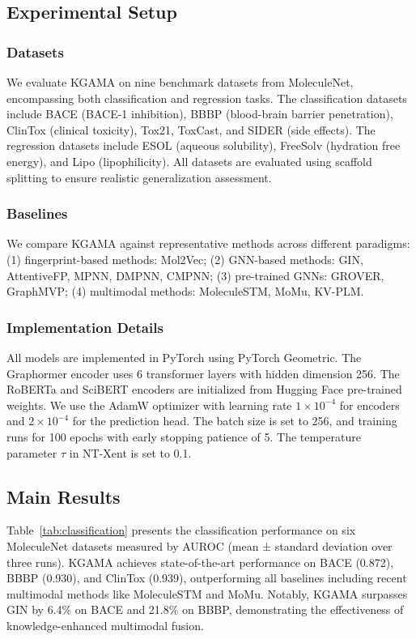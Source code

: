 \documentclass[journal]{IEEEtran}
\begin{document}
\subsection{Experimental Setup}
\subsubsection{Datasets}
We evaluate KGAMA on nine benchmark datasets from MoleculeNet, encompassing both classification and regression tasks. The classification datasets include BACE (BACE-1 inhibition), BBBP (blood-brain barrier penetration), ClinTox (clinical toxicity), Tox21, ToxCast, and SIDER (side effects). The regression datasets include ESOL (aqueous solubility), FreeSolv (hydration free energy), and Lipo (lipophilicity). All datasets are evaluated using scaffold splitting to ensure realistic generalization assessment.

\subsubsection{Baselines}
We compare KGAMA against representative methods across different paradigms: (1) fingerprint-based methods: Mol2Vec; (2) GNN-based methods: GIN, AttentiveFP, MPNN, DMPNN, CMPNN; (3) pre-trained GNNs: GROVER, GraphMVP; (4) multimodal methods: MoleculeSTM, MoMu, KV-PLM.

\subsubsection{Implementation Details}
All models are implemented in PyTorch using PyTorch Geometric. The Graphormer encoder uses 6 transformer layers with hidden dimension 256. The RoBERTa and SciBERT encoders are initialized from Hugging Face pre-trained weights. We use the AdamW optimizer with learning rate $1 \times 10^{-4}$ for encoders and $2 \times 10^{-4}$ for the prediction head. The batch size is set to 256, and training runs for 100 epochs with early stopping patience of 5. The temperature parameter $\tau$ in NT-Xent is set to 0.1.

\subsection{Main Results}
Table~\ref{tab:classification} presents the classification performance on six MoleculeNet datasets measured by AUROC (mean ± standard deviation over three runs). KGAMA achieves state-of-the-art performance on BACE (0.872), BBBP (0.930), and ClinTox (0.939), outperforming all baselines including recent multimodal methods like MoleculeSTM and MoMu. Notably, KGAMA surpasses GIN by 6.4\% on BACE and 21.8\% on BBBP, demonstrating the effectiveness of knowledge-enhanced multimodal fusion.
\end{document}

